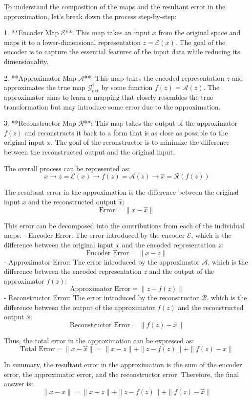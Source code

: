 To understand the composition of the maps and the resultant error in the approximation, let's break down the process step-by-step:

1. **Encoder Map \(\mathcal{E}\)**: This map takes an input \(x\) from the original space and maps it to a lower-dimensional representation \(z = \mathcal{E}(x)\). The goal of the encoder is to capture the essential features of the input data while reducing its dimensionality.

2. **Approximator Map \(\mathcal{A}\)**: This map takes the encoded representation \(z\) and approximates the true map \(\mathcal{G}^{\dagger}_{\text{ext}}\) by some function \(f(z) = \mathcal{A}(z)\). The approximator aims to learn a mapping that closely resembles the true transformation but may introduce some error due to the approximation.

3. **Reconstructor Map \(\mathcal{R}\)**: This map takes the output of the approximator \(f(z)\) and reconstructs it back to a form that is as close as possible to the original input \(x\). The goal of the reconstructor is to minimize the difference between the reconstructed output and the original input.

The overall process can be represented as:
\[ x \rightarrow z = \mathcal{E}(x) \rightarrow f(z) = \mathcal{A}(z) \rightarrow \hat{x} = \mathcal{R}(f(z)) \]

The resultant error in the approximation is the difference between the original input \(x\) and the reconstructed output \(\hat{x}\):
\[ \text{Error} = \| x - \hat{x} \| \]

This error can be decomposed into the contributions from each of the individual maps:
- Encoder Error: The error introduced by the encoder \(\mathcal{E}\), which is the difference between the original input \(x\) and the encoded representation \(z\):
  \[ \text{Encoder Error} = \| x - z \| \]
- Approximator Error: The error introduced by the approximator \(\mathcal{A}\), which is the difference between the encoded representation \(z\) and the output of the approximator \(f(z)\):
  \[ \text{Approximator Error} = \| z - f(z) \| \]
- Reconstructor Error: The error introduced by the reconstructor \(\mathcal{R}\), which is the difference between the output of the approximator \(f(z)\) and the reconstructed output \(\hat{x}\):
  \[ \text{Reconstructor Error} = \| f(z) - \hat{x} \| \]

Thus, the total error in the approximation can be expressed as:
\[ \text{Total Error} = \| x - \hat{x} \| = \| x - z \| + \| z - f(z) \| + \| f(z) - \hat{x} \| \]

In summary, the resultant error in the approximation is the sum of the encoder error, the approximator error, and the reconstructor error. Therefore, the final answer is:
\[
\boxed{\| x - \hat{x} \| = \| x - z \| + \| z - f(z) \| + \| f(z) - \hat{x} \|}
\]
